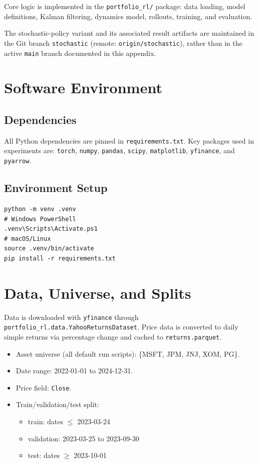 Core logic is implemented in the \texttt{portfolio\_rl/} package:
data loading, model definitions, Kalman filtering, dynamics model, rollouts,
training, and evaluation.

The stochastic-policy variant and its associated result artifacts are maintained
in the Git branch \texttt{stochastic} (remote: \texttt{origin/stochastic}),
rather than in the active \texttt{main} branch documented in this appendix.

\section{Software Environment}

\subsection{Dependencies}

All Python dependencies are pinned in \texttt{requirements.txt}. Key packages
used in experiments are:
\texttt{torch}, \texttt{numpy}, \texttt{pandas}, \texttt{scipy},
\texttt{matplotlib}, \texttt{yfinance}, and \texttt{pyarrow}.

\subsection{Environment Setup}

\begin{verbatim}
python -m venv .venv
# Windows PowerShell
.venv\Scripts\Activate.ps1
# macOS/Linux
source .venv/bin/activate
pip install -r requirements.txt
\end{verbatim}

\section{Data, Universe, and Splits}

Data is downloaded with \texttt{yfinance} through
\texttt{portfolio\_rl.data.YahooReturnsDataset}. Price data is converted to
daily simple returns via percentage change and cached to
\texttt{returns.parquet}.

\begin{itemize}
    \item Asset universe (all default run scripts): \{MSFT, JPM, JNJ, XOM, PG\}.
    \item Date range: 2022-01-01 to 2024-12-31.
    \item Price field: \texttt{Close}.
    \item Train/validation/test split:
    \begin{itemize}
        \item train: dates $\le$ 2023-03-24
        \item validation: 2023-03-25 to 2023-09-30
        \item test: dates $\ge$ 2023-10-01
    \end{itemize}
\end{itemize}

